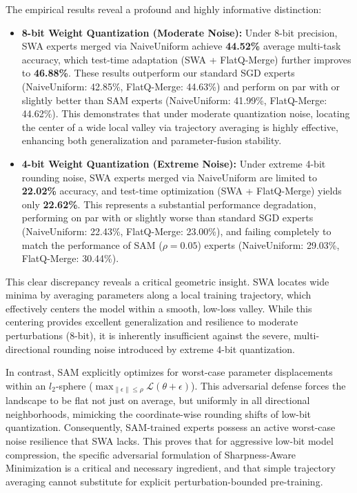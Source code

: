 The empirical results reveal a profound and highly informative distinction:
\begin{itemize}
    \item \textbf{8-bit Weight Quantization (Moderate Noise):} Under 8-bit precision, SWA experts merged via NaiveUniform achieve \textbf{44.52\%} average multi-task accuracy, which test-time adaptation (SWA + FlatQ-Merge) further improves to \textbf{46.88\%}. These results outperform our standard SGD experts (NaiveUniform: 42.85\%, FlatQ-Merge: 44.63\%) and perform on par with or slightly better than SAM experts (NaiveUniform: 41.99\%, FlatQ-Merge: 44.62\%). This demonstrates that under moderate quantization noise, locating the center of a wide local valley via trajectory averaging is highly effective, enhancing both generalization and parameter-fusion stability.
    \item \textbf{4-bit Weight Quantization (Extreme Noise):} Under extreme 4-bit rounding noise, SWA experts merged via NaiveUniform are limited to \textbf{22.02\%} accuracy, and test-time optimization (SWA + FlatQ-Merge) yields only \textbf{22.62\%}. This represents a substantial performance degradation, performing on par with or slightly worse than standard SGD experts (NaiveUniform: 22.43\%, FlatQ-Merge: 23.00\%), and failing completely to match the performance of SAM ($\rho=0.05$) experts (NaiveUniform: 29.03\%, FlatQ-Merge: 30.44\%).
\end{itemize}

This clear discrepancy reveals a critical geometric insight. SWA locates wide minima by averaging parameters along a local training trajectory, which effectively centers the model within a smooth, low-loss valley. While this centering provides excellent generalization and resilience to moderate perturbations (8-bit), it is inherently insufficient against the severe, multi-directional rounding noise introduced by extreme 4-bit quantization. 

In contrast, SAM explicitly optimizes for worst-case parameter displacements within an $l_2$-sphere ($\max_{\|\epsilon\| \le \rho} \mathcal{L}(\theta+\epsilon)$). This adversarial defense forces the landscape to be flat not just on average, but uniformly in all directional neighborhoods, mimicking the coordinate-wise rounding shifts of low-bit quantization. Consequently, SAM-trained experts possess an active worst-case noise resilience that SWA lacks. This proves that for aggressive low-bit model compression, the specific adversarial formulation of Sharpness-Aware Minimization is a critical and necessary ingredient, and that simple trajectory averaging cannot substitute for explicit perturbation-bounded pre-training.

